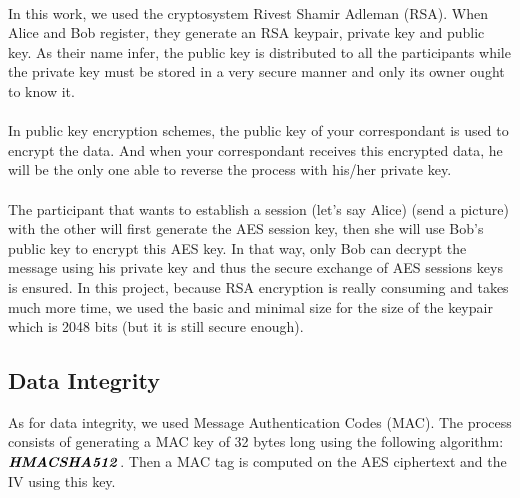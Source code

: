 	  \paragraph{}
	    In this work, we used the cryptosystem Rivest Shamir Adleman (RSA). When Alice and Bob register, they generate an RSA keypair, private key and public key. As their name infer, the public key is distributed to all the participants while the private key must be stored in a very secure manner and only its owner ought to know it.
	  \paragraph{}
	    In public key encryption schemes, the public key of your correspondant is used to encrypt the data. And when your correspondant receives this encrypted data, he will be the only one able to reverse the process with his/her private key.
	  \paragraph{}
	    The participant that wants to establish a session (let's say Alice) (send a picture) with the other will first generate the AES session key, then she will use Bob's public key to encrypt this AES key. In that way, only Bob can decrypt the message using his private key and thus the secure exchange of AES sessions keys is ensured. In this project, because RSA encryption is really consuming and takes much more time, we used the basic and minimal size for the size of the keypair which is 2048 bits (but it is still secure enough).

	
      \subsection{Data Integrity}
      
	As for data integrity, we used Message Authentication Codes (MAC). The process consists of generating a MAC key of 32 bytes long using the following algorithm: $\textbf{\textit{HMACSHA512}}$.
	Then a MAC tag is computed on the AES ciphertext and the IV using this key.
	
